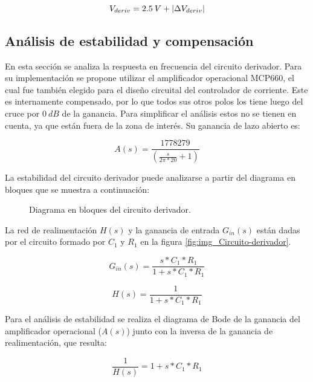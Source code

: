 \begin{equation}\label{eq_vderiv_neg}
	V_{deriv}=2.5\:V + \lvert\Delta V_{deriv}\rvert
\end{equation} 



\subsection{Análisis de estabilidad y compensación}

En esta sección se analiza la respuesta en frecuencia del circuito derivador. Para su implementación se propone utilizar el amplificador operacional MCP660, el cual fue también elegido para el diseño circuital del controlador de corriente. Este es internamente compensado, por lo que todos sus otros polos los tiene luego del cruce por $0\:dB$ de la ganancia. Para simplificar el análisis estos no se tienen en cuenta, ya que están fuera de la zona de interés. Su ganancia de lazo abierto es:

\begin{equation} \label{eq_Aw_1}
	A(s)=\frac{1778279}{(\frac{s}{2\pi *20}+1)}
\end{equation} 

La estabilidad del circuito derivador puede analizarse a partir del diagrama en bloques que se muestra a continuación:

\begin{figure}[H]
	\centering
	
	\caption{Diagrama en bloques del circuito derivador.}	\label{fig:img_diag-en-bloques_derivador}
\end{figure}



La red de realimentación $H(s)$ y la ganancia de entrada $G_{in}(s)$ están dadas por el circuito formado por $C_1$ y $R_1$ en la figura \ref{fig:img_Circuito-derivador}.

\begin{equation}
	G_{in}(s)=\frac{s*C_1*R_1}{1+s*C_1*R_1}
\end{equation}

\begin{equation}
	H(s)=\frac{1}{1+s*C_1*R_1}
\end{equation}

Para el análisis de estabilidad se realiza el diagrama de Bode de la ganancia del amplificador operacional ($A(s)$) junto con la inversa de la ganancia de realimentación, que resulta:

\begin{equation} \label{eq_Aw_2}
	\frac{1}{H(s)}=1+s*C_1*R_1
\end{equation}

